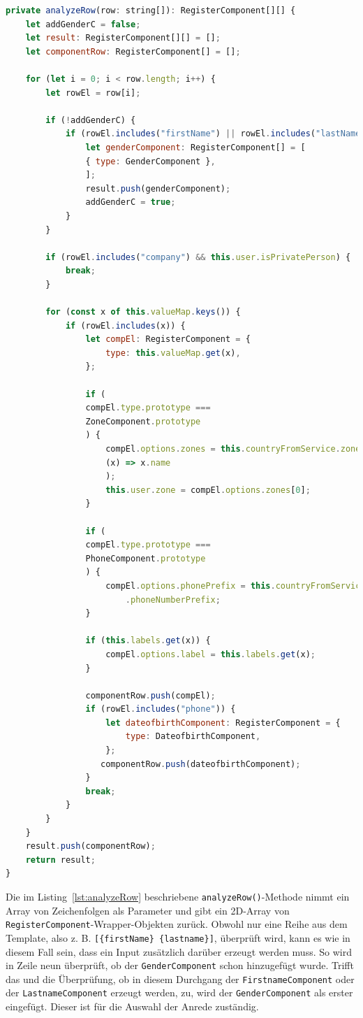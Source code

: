 \begin{lstlisting}[caption={Erstellung des 2D-Arrays für den Aufbau des RF}, language=JavaScript,label={lst:analyzeRow}]
private analyzeRow(row: string[]): RegisterComponent[][] {
	let addGenderC = false;
	let result: RegisterComponent[][] = [];
	let componentRow: RegisterComponent[] = [];
	
	for (let i = 0; i < row.length; i++) {
		let rowEl = row[i];
		
		if (!addGenderC) {
			if (rowEl.includes("firstName") || rowEl.includes("lastName")) {
				let genderComponent: RegisterComponent[] = [
				{ type: GenderComponent },
				];
				result.push(genderComponent);
				addGenderC = true;
			}
		}
		
		if (rowEl.includes("company") && this.user.isPrivatePerson) {
			break;
		}
		
		for (const x of this.valueMap.keys()) {
			if (rowEl.includes(x)) {
				let compEl: RegisterComponent = {
					type: this.valueMap.get(x),
				};
				
				if (
				compEl.type.prototype ===
				ZoneComponent.prototype
				) {
					compEl.options.zones = this.countryFromService.zones.map(
					(x) => x.name
					);
					this.user.zone = compEl.options.zones[0];
				}
				
				if (
				compEl.type.prototype ===
				PhoneComponent.prototype
				) {
					compEl.options.phonePrefix = this.countryFromService
						.phoneNumberPrefix;
				}
				
				if (this.labels.get(x)) {
					compEl.options.label = this.labels.get(x);
				}
				
				componentRow.push(compEl);
				if (rowEl.includes("phone")) {
					let dateofbirthComponent: RegisterComponent = {
						type: DateofbirthComponent,
					};
				   componentRow.push(dateofbirthComponent);
				}
				break;
			}
		}
	}
	result.push(componentRow);
	return result;
}
\end{lstlisting}

Die im Listing~\ref{lst:analyzeRow} beschriebene \texttt{analyzeRow()}-Methode nimmt ein Array von Zeichenfolgen als Parameter und gibt ein 2D-Array von \texttt{RegisterComponent}-Wrapper-Objekten zurück. Obwohl nur eine Reihe aus dem Template, also z. B. \texttt{[\{firstName\} \{lastname\}]}, überprüft wird, kann es wie in diesem Fall sein, dass ein Input zusätzlich darüber erzeugt werden muss. So wird in Zeile neun überprüft, ob der \texttt{GenderComponent} schon hinzugefügt wurde. Trifft das und die Überprüfung, ob in diesem Durchgang der \texttt{FirstnameComponent} oder der \texttt{LastnameComponent} erzeugt werden, zu, wird der \texttt{GenderComponent} als erster eingefügt. Dieser ist für die Auswahl der Anrede zuständig. 

